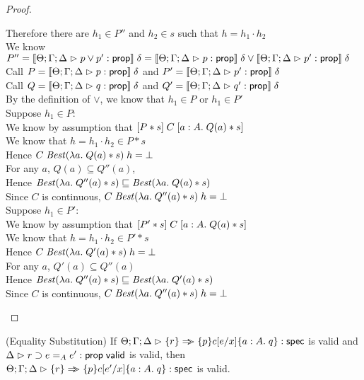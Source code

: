 \begin{proof}
\begin{tabbedproof}
    \oooooo Therefore there are $h_1 \in P''$ and $h_2 \in s$ such that $h = h_1 \cdot h_2$ \\
    \oooooo We know $P'' = [\![{{\Theta; \Gamma; \Delta} \vartriangleright {p \vee p'} : {\mathsf{prop}}}]\!]\;\delta = 
                           [\![{{\Theta; \Gamma; \Delta} \vartriangleright {p} : {\mathsf{prop}}}]\!]\;\delta \vee 
                           [\![{{\Theta; \Gamma; \Delta} \vartriangleright {p'} : {\mathsf{prop}}}]\!]\;\delta$ \\ 
    \oooooo Call $P = [\![{{\Theta; \Gamma; \Delta} \vartriangleright {p} : {\mathsf{prop}}}]\!]\;\delta$ and $P' = [\![{{\Theta; \Gamma; \Delta} \vartriangleright {p'} : {\mathsf{prop}}}]\!]\;\delta$ \\
    \oooooo Call $Q = [\![{{\Theta; \Gamma; \Delta} \vartriangleright {q} : {\mathsf{prop}}}]\!]\;\delta$ and $Q' = [\![{{\Theta; \Gamma; \Delta} \vartriangleright {q'} : {\mathsf{prop}}}]\!]\;\delta$ \\
    \oooooo By the definition of $\vee$, we know that $h_1 \in P$ or $h_1 \in P'$ \\
    \oooooo Suppose $h_1 \in P$: \\
    \ooooooo We know by assumption that $[{P * s}]\;{C}\;[{a:A}.\;{Q(a) * s}]$ \\
    \ooooooo We know that $h = h_1 \cdot h_2 \in P * s$ \\
    \ooooooo Hence $C\;\mathit{Best}(\lambda a.\;Q(a) * s)\;h = \bot$ \\
    \ooooooo For any $a$, $Q(a) \subseteq Q''(a)$, \\
    \ooooooo Hence $\mathit{Best}(\lambda a.\;Q''(a) * s) \sqsubseteq \mathit{Best}(\lambda a.\;Q(a) * s)$ \\ 
    \ooooooo Since $C$ is continuous, $C\;\mathit{Best}(\lambda a.\;Q''(a) * s)\;h = \bot$ \\
    \oooooo Suppose $h_1 \in P'$: \\
    \ooooooo We know by assumption that $[{P' * s}]\;{C}\;[{a:A}.\;{Q(a) * s}]$ \\
    \ooooooo We know that $h = h_1 \cdot h_2 \in P' * s$ \\
    \ooooooo Hence $C\;\mathit{Best}(\lambda a.\;Q'(a) * s)\;h = \bot$ \\
    \ooooooo For any $a$, $Q'(a) \subseteq Q''(a)$ \\
    \ooooooo Hence $\mathit{Best}(\lambda a.\;Q''(a) * s) \sqsubseteq \mathit{Best}(\lambda a.\;Q'(a) * s)$ \\
    \ooooooo Since $C$ is continuous, $C\;\mathit{Best}(\lambda a.\;Q''(a) * s)\;h = \bot$ \\
  \end{tabbedproof}
\end{proof}

\begin{lemma}{(Equality Substitution)}
If ${\Theta; \Gamma; \Delta} \vartriangleright {\{{r}\} \Rightarrow\!\!\!>\{{p}\}{c[e/x]}\{{a:A}.\;{q}\}} : \mathsf{spec}$ is valid and
${\Delta} \vartriangleright {r \supset e =_A e'} : \mathsf{prop} \;\mathsf{valid}$ is valid, then ${\Theta; \Gamma; \Delta} \vartriangleright {\{{r}\} \Rightarrow\!\!\!>\{{p}\}{c[e'/x]}\{{a:A}.\;{q}\}} : \mathsf{spec}$ is valid.
\end{lemma}


